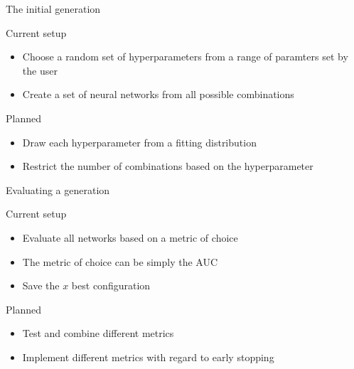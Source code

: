 \begin{frame}{The initial generation}
    \begin{block}{Current setup}
        \begin{itemize}
            \item Choose a random set of hyperparameters from a range of paramters set by the user
            \item Create a set of neural networks from all possible combinations
        \end{itemize}
    \end{block}
    \begin{block}{Planned}
        \begin{itemize}
            \item Draw each hyperparameter from a fitting distribution
            \item Restrict the number of combinations based on the hyperparameter
        \end{itemize}
    \end{block}
\end{frame}

\begin{frame}{Evaluating a generation}
    \begin{block}{Current setup}
        \begin{itemize}
            \item Evaluate all networks based on a metric of choice
            \item The metric of choice can be simply the AUC
            \item Save the $x$ best configuration
        \end{itemize}
    \end{block}
    \begin{block}{Planned}
        \begin{itemize}
            \item Test and combine different metrics
            \item Implement different metrics with regard to early stopping
        \end{itemize}
    \end{block}
\end{frame}

